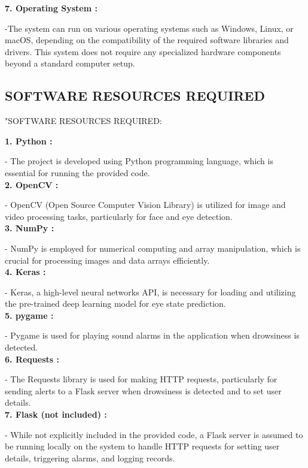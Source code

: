 \documentclass[12pt]{article}
\begin{document}
\textbf{7. Operating System :} 

-The system can run on various operating systems such as Windows, Linux, or macOS, depending on the compatibility of the required software libraries and drivers.
This system does not require any specialized hardware components beyond a standard computer setup.\\

\subsection{SOFTWARE RESOURCES REQUIRED}
"SOFTWARE RESOURCES REQUIRED:

\textbf{1. Python : }

- The project is developed using Python programming language, which is essential for running the provided code.\\

\textbf{2. OpenCV : }

- OpenCV (Open Source Computer Vision Library) is utilized for image and video processing tasks, particularly for face and eye detection.\\

\textbf{3. NumPy : }

- NumPy is employed for numerical computing and array manipulation, which is crucial for processing images and data arrays efficiently.\\

\textbf{4. Keras : }

- Keras, a high-level neural networks API, is necessary for loading and utilizing the pre-trained deep learning model for eye state prediction.\\

\textbf{5. pygame : }

- Pygame is used for playing sound alarms in the application when drowsiness is detected.\\

\textbf{6. Requests : }

- The Requests library is used for making HTTP requests, particularly for sending alerts to a Flask server when drowsiness is detected and to set user details.\\

\textbf{7. Flask (not included) :}

- While not explicitly included in the provided code, a Flask server is assumed to be running locally on the system to handle HTTP requests for setting user details, triggering alarms, and logging records.\\
\end{document}
